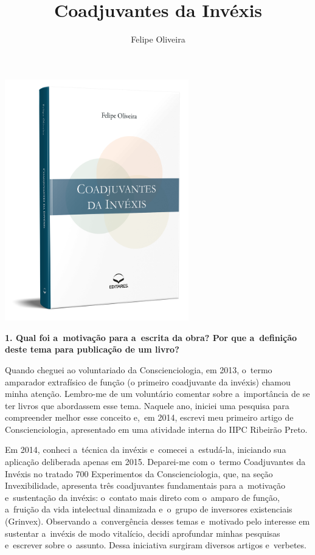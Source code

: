 \documentclass{gescons}
\author{Felipe Oliveira}
\title{Coadjuvantes da Invéxis}
\begin{document}
    \makeentrevistatitle

    \begin{multicols}{2}

\begin{center}
    \includegraphics[width=8cm]{articles/entrevista/mockups/Felipe_Oliveira}
\end{center}


\textbf{1. Qual foi a~motivação para a~escrita da obra? Por que a~definição deste tema para publicação de um livro?}

Quando cheguei ao voluntariado da Conscienciologia, em 2013, o~termo amparador extrafísico de função (o primeiro coadjuvante da invéxis) chamou minha atenção. Lembro-me de um voluntário comentar sobre a~importância de se ter livros que abordassem esse tema. Naquele ano, iniciei uma pesquisa para compreender melhor esse conceito e,~em 2014, escrevi meu primeiro artigo de Conscienciologia, apresentado em uma atividade interna do IIPC Ribeirão Preto.

Em 2014, conheci a~técnica da invéxis e~comecei a~estudá-la, iniciando sua aplicação deliberada apenas em 2015. Deparei-me com o~termo Coadjuvantes da Invéxis no tratado 700 Experimentos da Conscienciologia, que, na seção Invexibilidade, apresenta três coadjuvantes fundamentais para a~motivação e~sustentação da invéxis: o~contato mais direto com o~amparo de função, a~fruição da vida intelectual dinamizada e~o~grupo de inversores existenciais (Grinvex). Observando a~convergência desses temas e~motivado pelo interesse em sustentar a~invéxis de modo vitalício, decidi aprofundar minhas pesquisas e~escrever sobre o~assunto. Dessa iniciativa surgiram diversos artigos e~verbetes.


\end{multicols}
\end{document}
